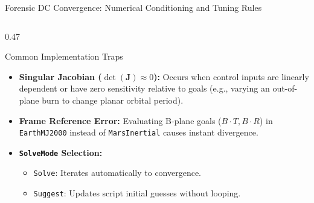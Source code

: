 \documentclass[aspectratio=169, 10pt]{beamer}
\begin{document}
\begin{frame}{Forensic DC Convergence: Numerical Conditioning and Tuning Rules}
\begin{columns}[t]
        \begin{column}{0.47\textwidth}
            \begin{alertblock}{Common Implementation Traps}
                \scriptsize
                \begin{itemize}\setlength{\itemsep}{2pt}
                    \item \textbf{Singular Jacobian ($\det(\mathbf{J}) \approx 0$):} Occurs when control inputs are linearly dependent or have zero sensitivity relative to goals (e.g., varying an out-of-plane burn to change planar orbital period).
                    \item \textbf{Frame Reference Error:} Evaluating B-plane goals ($B\cdot T, B\cdot R$) in \texttt{EarthMJ2000} instead of \texttt{MarsInertial} causes instant divergence.
                    \item \textbf{\texttt{SolveMode} Selection:}
                    \begin{itemize}\setlength{\itemsep}{0.5pt}
                        \item \texttt{Solve}: Iterates automatically to convergence.
                        \item \texttt{Suggest}: Updates script initial guesses without looping.
                    \end{itemize}
                \end{itemize}
            \end{alertblock}
        \end{column}
    \end{columns}
\end{frame}
\end{document}
